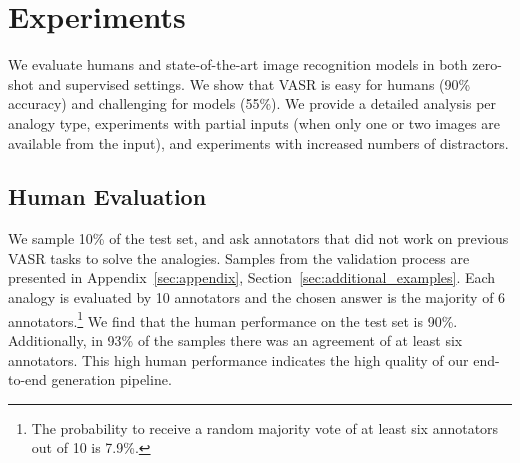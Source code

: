 \documentclass[letterpaper]{article} \usepackage{aaai23}  \usepackage{times}  \usepackage{helvet}  \usepackage{courier}  \usepackage[hyphens]{url}  \usepackage{graphicx} \urlstyle{rm} \def\UrlFont{\rm}  \usepackage{natbib}  \usepackage{caption} \frenchspacing  \setlength{\pdfpagewidth}{8.5in}  \setlength{\pdfpageheight}{11in}  \usepackage{algorithm}
\begin{document}
\section{Experiments}
\label{sec:experiments}
We evaluate humans and state-of-the-art image recognition models in both zero-shot and supervised settings. We show that VASR is easy for humans (90\% accuracy) and challenging for models (55\%). We provide a detailed analysis per analogy type, experiments with partial inputs (when only one or two images are available from the input), and experiments with increased numbers of distractors.



\subsection{Human Evaluation}
We sample 10\% of the test set, and ask annotators that did not work on previous VASR tasks to solve the analogies. Samples from the validation process are presented in Appendix~\ref{sec:appendix}, Section~\ref{sec:additional_examples}. Each analogy is evaluated by 10 annotators and the chosen answer is the majority of 6 annotators.\footnote{The probability to receive a random majority vote of at least six annotators out of 10 is 7.9\%.} We find that the human performance on the test set is 90\%. Additionally, in 93\% of the samples there was an agreement of at least six annotators. This high human performance indicates the high
quality of our end-to-end generation pipeline. 
\end{document}
